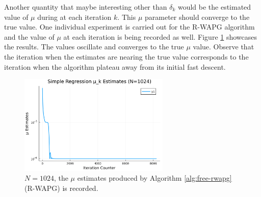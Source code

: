 \documentclass[12pt]{article}
\begin{document}
        \par
        Another quantity that maybe interesting other than $\delta_k$ would be the estimated value of $\mu$ during at each iteration $k$. 
        This $\mu$ parameter should converge to the true value. 
        One individual experiment is carried out for the R-WAPG algorithm and the value of $\mu$ at each iteration is being recorded as well. 
        Figure \ref{fig:simple-quadratic-r-wapg-mu-estimates} showcases the results. 
        The values oscillate and converges to the true $\mu$ value. 
        Observe that the iteration when the estimates are nearing the true value corresponds to the iteration when the algorithm plateau away from its initial fast descent. 
        \begin{figure}[H]
            \centering
            \includegraphics[width=0.64\textwidth]{assets/simple_regression_loss_sc_estimates_1024.png}
            \caption{$N = 1024$, the $\mu$ estimates produced by Algorithm \ref{alg:free-rwapg} (R-WAPG) is recorded. }
            \label{fig:simple-quadratic-r-wapg-mu-estimates}
        \end{figure}
\end{document}
